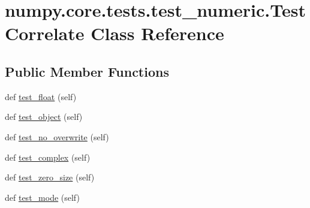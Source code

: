 \hypertarget{classnumpy_1_1core_1_1tests_1_1test__numeric_1_1TestCorrelate}{}\section{numpy.\+core.\+tests.\+test\+\_\+numeric.\+Test\+Correlate Class Reference}
\label{classnumpy_1_1core_1_1tests_1_1test__numeric_1_1TestCorrelate}
\subsection*{Public Member Functions}
\begin{DoxyCompactItemize}
\item 
def \hyperlink{classnumpy_1_1core_1_1tests_1_1test__numeric_1_1TestCorrelate_abcb1b58a734f29a7868f7ae60740c863}{test\+\_\+float} (self)
\item 
def \hyperlink{classnumpy_1_1core_1_1tests_1_1test__numeric_1_1TestCorrelate_a2a11bd6cdd726ff54097e67b6bbd079f}{test\+\_\+object} (self)
\item 
def \hyperlink{classnumpy_1_1core_1_1tests_1_1test__numeric_1_1TestCorrelate_abf62568cdaec0d20d1f17bb062dc56bf}{test\+\_\+no\+\_\+overwrite} (self)
\item 
def \hyperlink{classnumpy_1_1core_1_1tests_1_1test__numeric_1_1TestCorrelate_a9df6a9cbb2d61c5dfe9ffe8973554aed}{test\+\_\+complex} (self)
\item 
def \hyperlink{classnumpy_1_1core_1_1tests_1_1test__numeric_1_1TestCorrelate_abcb2170797ef1ec0225b3466828e427c}{test\+\_\+zero\+\_\+size} (self)
\item 
def \hyperlink{classnumpy_1_1core_1_1tests_1_1test__numeric_1_1TestCorrelate_a49bc928c1c034276f5b09271472decfe}{test\+\_\+mode} (self)
\end{DoxyCompactItemize}
